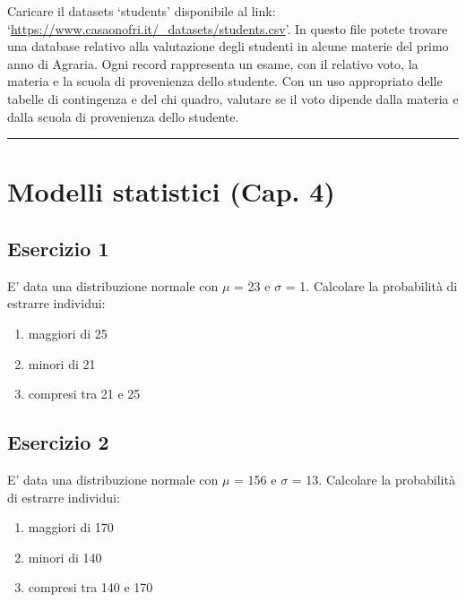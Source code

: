 \documentclass[a4paper,12pt,oneside]{book}
\providecommand{\tightlist}{%
  \setlength{\itemsep}{0pt}\setlength{\parskip}{0pt}}
\begin{document}
Caricare il datasets `students' disponibile al link: `\url{https://www.casaonofri.it/_datasets/students.csv}'. In questo file potete trovare una database relativo alla valutazione degli studenti in alcune materie del primo anno di Agraria. Ogni record rappresenta un esame, con il relativo voto, la materia e la scuola di provenienza dello studente. Con un uso appropriato delle tabelle di contingenza e del chi quadro, valutare se il voto dipende dalla materia e dalla scuola di provenienza dello studente.

\begin{center}\rule{0.5\linewidth}{0.5pt}\end{center}

\hypertarget{modelli-statistici-cap.-4}{%
\section{Modelli statistici (Cap. 4)}\label{modelli-statistici-cap.-4}}

\hypertarget{esercizio-1-2}{%
\subsection{Esercizio 1}\label{esercizio-1-2}}

E' data una distribuzione normale con \(\mu\) = 23 e \(\sigma\) = 1. Calcolare la probabilità di estrarre individui:

\begin{enumerate}
\def\labelenumi{\arabic{enumi}.}
\tightlist
\item
  maggiori di 25
\item
  minori di 21
\item
  compresi tra 21 e 25
\end{enumerate}

\hypertarget{esercizio-2-2}{%
\subsection{Esercizio 2}\label{esercizio-2-2}}

E' data una distribuzione normale con \(\mu\) = 156 e \(\sigma\) = 13. Calcolare la probabilità di estrarre individui:

\begin{enumerate}
\def\labelenumi{\arabic{enumi}.}
\tightlist
\item
  maggiori di 170
\item
  minori di 140
\item
  compresi tra 140 e 170
\end{enumerate}
\end{document}
